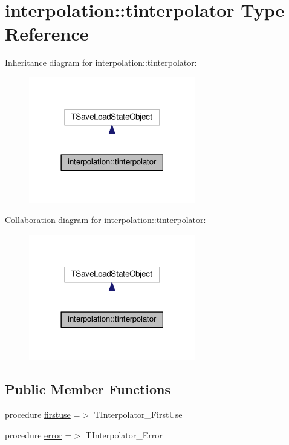 \hypertarget{structinterpolation_1_1tinterpolator}{}\section{interpolation\+:\+:tinterpolator Type Reference}
\label{structinterpolation_1_1tinterpolator}


Inheritance diagram for interpolation\+:\+:tinterpolator\+:
\nopagebreak
\begin{figure}[H]
\begin{center}
\leavevmode
\includegraphics[width=206pt]{structinterpolation_1_1tinterpolator__inherit__graph}
\end{center}
\end{figure}


Collaboration diagram for interpolation\+:\+:tinterpolator\+:
\nopagebreak
\begin{figure}[H]
\begin{center}
\leavevmode
\includegraphics[width=206pt]{structinterpolation_1_1tinterpolator__coll__graph}
\end{center}
\end{figure}
\subsection*{Public Member Functions}
\begin{DoxyCompactItemize}
\item 
procedure \mbox{\hyperlink{structinterpolation_1_1tinterpolator_ad2fa0df2f55d0e9e43870da7d5a38bfe}{firstuse}} =$>$ T\+Interpolator\+\_\+\+First\+Use
\item 
procedure \mbox{\hyperlink{structinterpolation_1_1tinterpolator_a02dd0723f7a9357ca22caa2f3da74dce}{error}} =$>$ T\+Interpolator\+\_\+\+Error
\end{DoxyCompactItemize}
